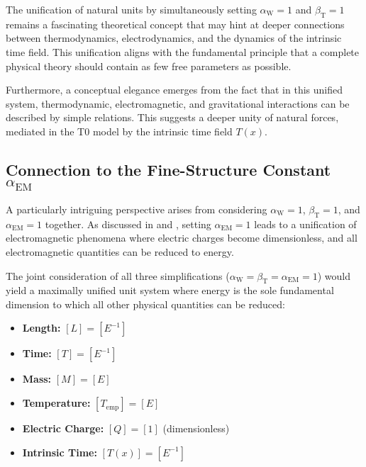 \documentclass[12pt,a4paper]{article}
\newcommand{\Tfield}{T(x)}
\newcommand{\betaT}{\beta_{\text{T}}}
\newcommand{\alphaEM}{\alpha_{\text{EM}}}
\newcommand{\alphaW}{\alpha_{\text{W}}}
\begin{document}
	The unification of natural units by simultaneously setting \(\alphaW = 1\) and \(\betaT = 1\) remains a fascinating theoretical concept that may hint at deeper connections between thermodynamics, electrodynamics, and the dynamics of the intrinsic time field. This unification aligns with the fundamental principle that a complete physical theory should contain as few free parameters as possible.
	
	Furthermore, a conceptual elegance emerges from the fact that in this unified system, thermodynamic, electromagnetic, and gravitational interactions can be described by simple relations. This suggests a deeper unity of natural forces, mediated in the T0 model by the intrinsic time field \(\Tfield\).
	
	\subsection{Connection to the Fine-Structure Constant \(\alphaEM\)}
	
	A particularly intriguing perspective arises from considering \(\alphaW = 1\), \(\betaT = 1\), and \(\alphaEM = 1\) together. As discussed in \cite{pascher_alpha_2025} and \cite{pascher_alphabeta_2025}, setting \(\alphaEM = 1\) leads to a unification of electromagnetic phenomena where electric charges become dimensionless, and all electromagnetic quantities can be reduced to energy.
	
	The joint consideration of all three simplifications (\(\alphaW = \betaT = \alphaEM = 1\)) would yield a maximally unified unit system where energy is the sole fundamental dimension to which all other physical quantities can be reduced:
	
	\begin{tcolorbox}[colback=blue!5!white,colframe=blue!75!black,title=Fully Unified Unit System]
		\begin{itemize}
			\item \textbf{Length:} \([L] = [E^{-1}]\)
			\item \textbf{Time:} \([T] = [E^{-1}]\)
			\item \textbf{Mass:} \([M] = [E]\)
			\item \textbf{Temperature:} \([T_{\text{emp}}] = [E]\)
			\item \textbf{Electric Charge:} \([Q] = [1]\) (dimensionless)
			\item \textbf{Intrinsic Time:} \([\Tfield] = [E^{-1}]\)
		\end{itemize}
	\end{tcolorbox}
	
\end{document}
